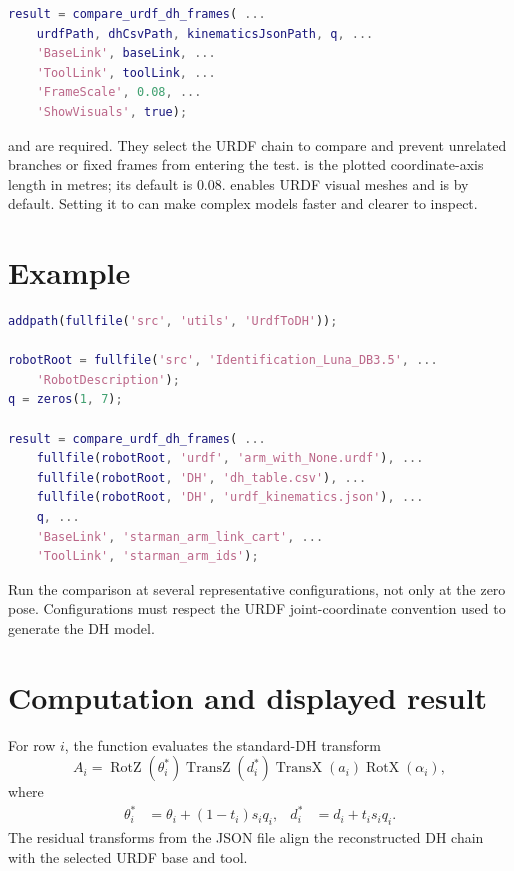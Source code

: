 \documentclass[11pt,a4paper]{article}
\begin{document}
\begin{lstlisting}[language=Matlab]
result = compare_urdf_dh_frames( ...
    urdfPath, dhCsvPath, kinematicsJsonPath, q, ...
    'BaseLink', baseLink, ...
    'ToolLink', toolLink, ...
    'FrameScale', 0.08, ...
    'ShowVisuals', true);
\end{lstlisting}

 and  are required. They select the URDF chain
to compare and prevent unrelated branches or fixed frames from entering the
test.  is the plotted coordinate-axis length in metres;
its default is $0.08$.  enables URDF visual meshes and is
 by default. Setting it to  can make complex models
faster and clearer to inspect.

\section{Example}

\begin{lstlisting}[language=Matlab]
addpath(fullfile('src', 'utils', 'UrdfToDH'));

robotRoot = fullfile('src', 'Identification_Luna_DB3.5', ...
    'RobotDescription');
q = zeros(1, 7);

result = compare_urdf_dh_frames( ...
    fullfile(robotRoot, 'urdf', 'arm_with_None.urdf'), ...
    fullfile(robotRoot, 'DH', 'dh_table.csv'), ...
    fullfile(robotRoot, 'DH', 'urdf_kinematics.json'), ...
    q, ...
    'BaseLink', 'starman_arm_link_cart', ...
    'ToolLink', 'starman_arm_ids');
\end{lstlisting}

Run the comparison at several representative configurations, not only at the
zero pose. Configurations must respect the URDF joint-coordinate convention
used to generate the DH model.

\section{Computation and displayed result}

For row $i$, the function evaluates the standard-DH transform
\begin{equation}
 A_i = \operatorname{RotZ}(\theta_i^*)
       \operatorname{TransZ}(d_i^*)
       \operatorname{TransX}(a_i)
       \operatorname{RotX}(\alpha_i),
\end{equation}
where
\begin{align}
 \theta_i^* &= \theta_i + (1-t_i)s_iq_i, &
 d_i^* &= d_i + t_is_iq_i.
\end{align}
The residual transforms from the JSON file align the reconstructed DH chain
with the selected URDF base and tool.
\end{document}
